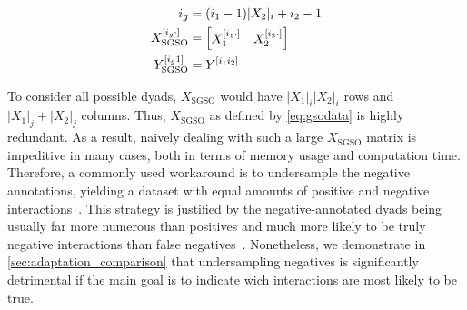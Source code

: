 %
\begin{equation}
    \begin{split}
    i_g &= (i_1-1)|X_2|_i+i_2-1\\
    X_\text{SGSO} ^{[i_g\cdot]} &= \begin{bmatrix} X_1 ^{[i_1\cdot]} & X_2^{[i_2\cdot]}\end{bmatrix}\\
    Y_\text{SGSO} ^{[i_g1]} &= Y^{[i_1i_2]}
    \end{split}
    \label{eq:gsodata}
\end{equation}

To consider all possible dyads, $X_\text{SGSO}$ would have $|X_1|_i|X_2|_i$ rows and $|X_1|_j+|X_2|_j$ columns. Thus, $X_\text{SGSO}$ as defined by \autoref{eq:gsodata} is highly redundant.
As a result, naively dealing with such a large $X_\text{SGSO}$ matrix is impeditive in many cases, both in terms of memory usage and computation time. Therefore, a commonly used workaround is to undersample the negative annotations, yielding a dataset with equal amounts of positive and negative interactions~\cite{}.
This strategy is justified by the negative-annotated dyads being usually far more numerous than positives and much more likely to be truly negative interactions than false negatives~\cite{}.
Nonetheless, we demonstrate in \autoref{sec:adaptation_comparison} that undersampling negatives is significantly detrimental if the main goal is to indicate wich interactions are most likely to be true.

